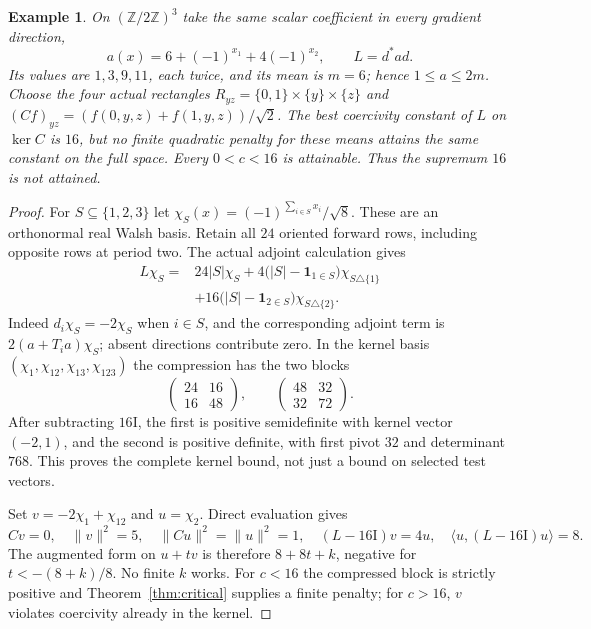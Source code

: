 \documentclass[11pt,a4paper]{article}
\newtheorem{example}[theorem]{Example}
\newcommand{\id}{\mathrm I}
\begin{document}
\begin{example}\label{ex:rectangle}
On $(\mathbb Z/2\mathbb Z)^3$ take the same scalar coefficient in every
gradient direction,
\[
 a(x)=6+(-1)^{x_1}+4(-1)^{x_2},\qquad L=d^*ad.
\]
Its values are $1,3,9,11$, each twice, and its mean is $m=6$; hence
$1\leq a\leq2m$. Choose the four actual rectangles
$R_{yz}=\{0,1\}\times\{y\}\times\{z\}$ and
$(Cf)_{yz}=(f(0,y,z)+f(1,y,z))/\sqrt2$.
The best coercivity constant of $L$ on $\ker C$ is $16$, but no finite
quadratic penalty for these means attains the same constant on the full
space. Every $0<c<16$ is attainable. Thus the supremum $16$ is not attained.
\end{example}
\begin{proof}
For $S\subseteq\{1,2,3\}$ let
$\chi_S(x)=(-1)^{\sum_{i\in S}x_i}/\sqrt8$. These are an orthonormal real
Walsh basis. Retain all $24$ oriented forward rows, including opposite rows
at period two. The actual adjoint calculation gives
\begin{align*}
 L\chi_S={}&24|S|\chi_S
 +4\bigl(|S|-\boldsymbol1_{1\in S}\bigr)\chi_{S\triangle\{1\}}\\
 &+16\bigl(|S|-\boldsymbol1_{2\in S}\bigr)\chi_{S\triangle\{2\}}.
\end{align*}
Indeed $d_i\chi_S=-2\chi_S$ when $i\in S$, and the corresponding
adjoint term is $2(a+T_i a)\chi_S$; absent directions contribute zero.
In the kernel basis $(\chi_1,\chi_{12},\chi_{13},\chi_{123})$ the compression
has the two blocks
\[
 \begin{pmatrix}24&16\\16&48\end{pmatrix},\qquad
 \begin{pmatrix}48&32\\32&72\end{pmatrix}.
\]
After subtracting $16\id$, the first is positive semidefinite with kernel
vector $(-2,1)$, and the second is positive definite, with first pivot $32$
and determinant $768$. This proves the complete kernel bound, not just a
bound on selected test vectors.

Set $v=-2\chi_1+\chi_{12}$ and $u=\chi_2$. Direct evaluation gives
\[
 Cv=0,\quad\|v\|^2=5,\quad\|Cu\|^2=\|u\|^2=1,
 \quad(L-16\id)v=4u,\quad\langle u,(L-16\id)u\rangle=8.
\]
The augmented form on $u+tv$ is therefore $8+8t+k$, negative for
$t<-(8+k)/8$. No finite $k$ works. For $c<16$ the compressed block is
strictly positive and Theorem~\ref{thm:critical} supplies a finite penalty;
for $c>16$, $v$ violates coercivity already in the kernel.
\end{proof}
\end{document}
